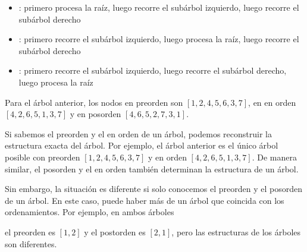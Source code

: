 \begin{itemize}
\item {}: primero procesa la raíz,
luego recorre el subárbol izquierdo, luego recorre el subárbol derecho
\item {}: primero recorre el subárbol izquierdo,
luego procesa la raíz, luego recorre el subárbol derecho
\item {}: primero recorre el subárbol izquierdo,
luego recorre el subárbol derecho, luego procesa la raíz
\end{itemize}

Para el árbol anterior, los nodos en
preorden son
$[1,2,4,5,6,3,7]$,
en en orden $[4,2,6,5,1,3,7]$
y en posorden $[4,6,5,2,7,3,1]$.

Si sabemos el preorden y el en orden
de un árbol, podemos reconstruir la estructura exacta del árbol.
Por ejemplo, el árbol anterior es el único árbol posible
con preorden $[1,2,4,5,6,3,7]$ y
en orden $[4,2,6,5,1,3,7]$.
De manera similar, el posorden y el en orden
también determinan la estructura de un árbol.

Sin embargo, la situación es diferente si solo conocemos
el preorden y el posorden de un árbol.
En este caso, puede haber más de un árbol
que coincida con los ordenamientos.
Por ejemplo, en ambos árboles
\begin{center}
\end{center}
el preorden es $[1,2]$ y el postorden es $[2,1]$,
pero las estructuras de los árboles son diferentes. 
